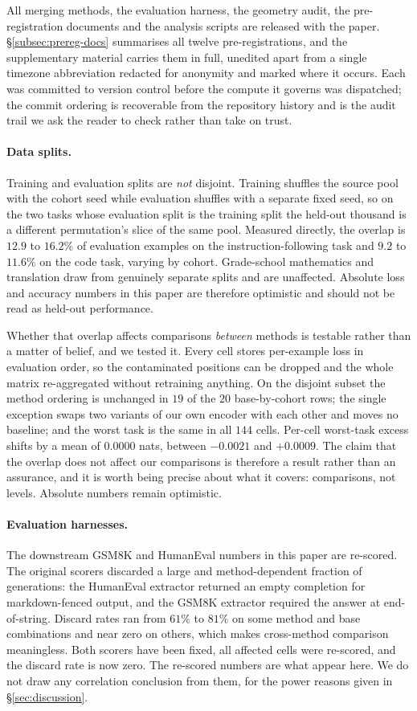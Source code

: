 All merging methods, the evaluation harness, the geometry audit, the
pre-registration documents and the analysis scripts are released with the
paper. \S\ref{subsec:prereg-docs} summarises all twelve pre-registrations, and the
supplementary material carries them in full, unedited apart from a single
timezone abbreviation redacted for anonymity and marked where it occurs. Each was committed to version control
before the compute it governs was dispatched; the commit ordering is
recoverable from the repository history and is the audit trail we ask the
reader to check rather than take on trust.

\paragraph{Data splits.} Training and evaluation splits are \emph{not}
disjoint.
Training shuffles the source pool with the cohort seed while evaluation
shuffles with a separate fixed seed, so on the two tasks whose evaluation
split is the training split the held-out thousand is a different
permutation's slice of the same pool. Measured directly, the overlap is
$12.9$ to $16.2\%$ of evaluation examples on the instruction-following
task and $9.2$ to $11.6\%$ on the code task, varying by cohort. Grade-school
mathematics and translation draw from genuinely separate splits and are
unaffected. Absolute loss and accuracy numbers in this paper are therefore
optimistic and should not be read as held-out performance.

Whether that overlap affects comparisons \emph{between} methods is
testable rather than a matter of belief, and we tested it.
Every cell stores per-example loss in evaluation order, so the
contaminated positions can be dropped and the whole matrix re-aggregated
without retraining anything. On the disjoint subset the method ordering is
unchanged in $19$ of the $20$ base-by-cohort rows; the single exception
swaps two variants of our own encoder with each other and moves no
baseline; and the worst task is the same in all $144$ cells. Per-cell
worst-task excess shifts by a mean of $0.0000$ nats, between $-0.0021$ and
$+0.0009$. The claim that the overlap does not affect our comparisons is
therefore a result rather than an assurance, and it is worth being precise
about what it covers: comparisons, not levels. Absolute numbers remain
optimistic.

\paragraph{Evaluation harnesses.} The downstream GSM8K and HumanEval
numbers in this paper are re-scored. The original scorers discarded
a large and method-dependent fraction of generations: the HumanEval
extractor returned an empty completion for markdown-fenced output, and the
GSM8K extractor required the answer at end-of-string. Discard rates ran
from $61\%$ to $81\%$ on some method and base combinations and near zero
on others, which makes cross-method comparison meaningless. Both scorers
have been fixed, all affected cells were re-scored, and the discard rate
is now zero. The re-scored numbers are what appear here. We do not draw
any correlation conclusion from them, for the power reasons given in
\S\ref{sec:discussion}.

